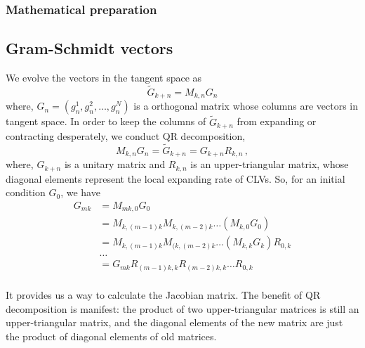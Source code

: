 \subsubsection{Mathematical preparation}


\subsection{Gram-Schmidt vectors}

   We evolve the vectors in the tangent space as
   \begin{equation}
    \tilde{G}_{k+n}=M_{k,n}G_{n}
   \end{equation}
   where, $G_{n}=(g^{1}_{n},g^{2}_{n},\dots ,g^{N}_{n})$ is a orthogonal matrix
   whose columns are vectors in tangent space. In order to keep the
   columns of $\tilde{G}_{k+n}$ from expanding or contracting desperately,
   we conduct QR decomposition,
    \begin{equation}
    M_{k,n}G_{n}=\tilde{G}_{k+n}=G_{k+n}R_{k,n}
    \,,
    \label{eq::xiong_qr}
   \end{equation}
where, $G_{k+n}$ is a unitary matrix and $R_{k,n}$ is an upper-triangular matrix, whose diagonal
    elements represent the local expanding rate of CLVs.
    So, for an initial condition $G_{0}$, we have
    \begin{align*}
     G_{mk} &=M_{mk,0}G_{0} \\
     & =M_{k,(m-1)k}M_{k,(m-2)k}\dots (M_{k,0}G_{0}) \\
     & =M_{k,(m-1)k}M_{(k,(m-2)k}\dots (M_{k,k}G_{k})R_{0,k} \\
     & \dots  \\
     & =G_{mk}R_{(m-1)k,k}R_{(m-2)k,k}\dots R_{0,k} \\
    \end{align*}

    It provides us a way to calculate the Jacobian matrix. The benefit of QR decomposition is manifest:
    the product of two upper-triangular matrices is still an upper-triangular matrix, and the diagonal
    elements of the new matrix are just the product of diagonal elements of old matrices.

